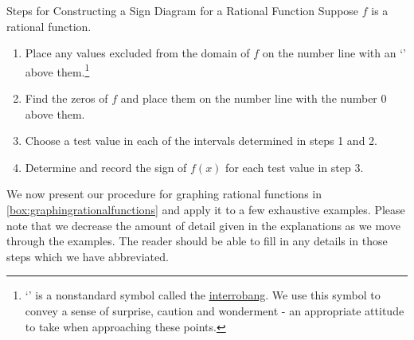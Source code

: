 \label{rationalsigndiagram}

\begin{ifloatbox}{Steps for Constructing a Sign Diagram for a Rational Function}
\label{box:signdiagramforrationalfunction}
Suppose $f$ is a rational function. 

\begin{enumerate}

\item  Place any values excluded from the domain of  $f$ on the number line with an `\textinterrobang' above them.\footnote{ `\textinterrobang' is a nonstandard symbol called the \href{http://en.wikipedia.org/wiki/Interrobang}{\underline{interrobang}}.   We use this symbol to convey a sense of surprise, caution and wonderment - an appropriate attitude to take when approaching these points.}   

\item  Find the zeros of $f$ and place them on the number line with the number $0$ above them.

\item  Choose a test value in each of the intervals determined in steps 1 and 2.

\item  Determine and record the sign of $f(x)$ for each test value in step 3.

\end{enumerate}

\end{ifloatbox}

We now present our procedure for graphing rational functions in \autoref{box:graphingrationalfunctions} and apply it to a few exhaustive examples.  Please note that we decrease the amount of detail given in the explanations as we move through the examples.  The reader should be able to fill in any details in those steps which we have abbreviated.


